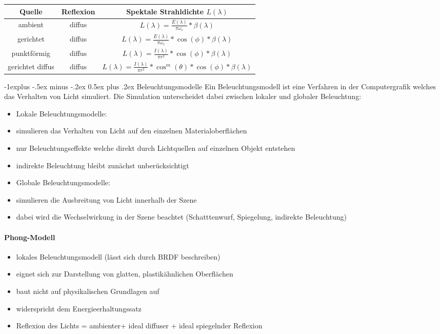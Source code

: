 \documentclass[10pt,landscape]{article}
\makeatletter
\renewcommand{\subsection}{\@startsection{subsection}{2}{0mm}%
                                {-1explus -.5ex minus -.2ex}%
                                {0.5ex plus .2ex}%
                                {\normalfont\normalsize\bfseries}}
\makeatother
\begin{document}
\begin{multicols}{3}
{  \begin{tabular}{c | c | c}
    Quelle           & Reflexion & Spektale Strahldichte $L(\lambda)$                                                 \\\hline
    ambient          & diffus    & $L(\lambda)=\frac{E(\lambda)}{\pi\omega_r}*\beta(\lambda)$                         \\
    gerichtet        & diffus    & $L(\lambda)=\frac{E(\lambda)}{\pi\omega_r}*\cos(\phi)*\beta(\lambda)$              \\
    punktförmig      & diffus    & $L(\lambda) = \frac{I(\lambda)}{\pi r^2 }*\cos(\phi)*\beta(\lambda)$               \\
    gerichtet diffus & diffus    & $L(\lambda)=\frac{I(\lambda)}{\pi r^2 }* \cos^m(\theta)*\cos(\phi)*\beta(\lambda)$ \\
  \end{tabular}
  
  \subsection{ Beleuchtungsmodelle}
  Ein Beleuchtungsmodell ist eine Verfahren in der Computergrafik welches das Verhalten von Licht simuliert. Die Simulation unterscheidet dabei zwischen lokaler und globaler Beleuchtung:
  \begin{itemize}
    \item Lokale Beleuchtungsmodelle:
    \item simulieren das Verhalten von Licht auf den einzelnen Materialoberflächen
    \item nur Beleuchtungseffekte welche direkt durch Lichtquellen auf einzelnen Objekt entstehen
    \item indirekte Beleuchtung bleibt zunächst unberücksichtigt
    \item Globale Beleuchtungsmodelle:
    \item simulieren die Ausbreitung von Licht innerhalb der Szene
    \item dabei wird die Wechselwirkung in der Szene beachtet (Schatttenwurf, Spiegelung, indirekte Beleuchtung)
  \end{itemize}
  
  \paragraph{Phong-Modell}
  \begin{itemize}
    \item lokales Beleuchtungsmodell (lässt sich durch BRDF beschreiben)
    \item eignet sich zur Darstellung von glatten, plastikähnlichen Oberflächen
    \item baut nicht auf physikalischen Grundlagen auf
    \item widerspricht dem Energieerhaltungssatz
    \item Reflexion des Lichts = ambienter+ ideal diffuser + ideal spiegelnder Reflexion
  \end{itemize}
  
}
\end{multicols}
\end{document}
